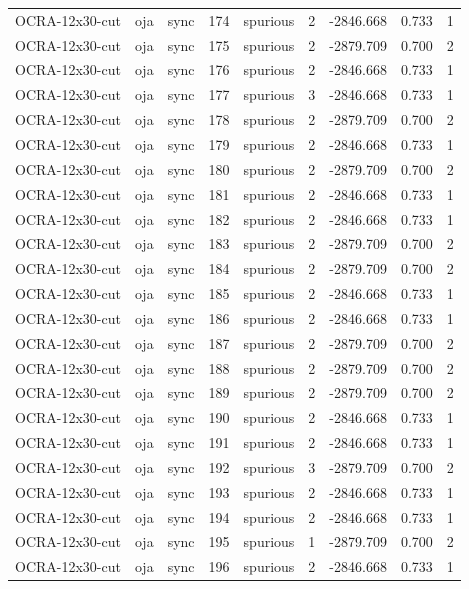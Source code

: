\begin{tabular}{lllrlrrrr}
OCRA-12x30-cut & oja & sync & 174 & spurious & 2 & -2846.668 & 0.733 & 1 \\
OCRA-12x30-cut & oja & sync & 175 & spurious & 2 & -2879.709 & 0.700 & 2 \\
OCRA-12x30-cut & oja & sync & 176 & spurious & 2 & -2846.668 & 0.733 & 1 \\
OCRA-12x30-cut & oja & sync & 177 & spurious & 3 & -2846.668 & 0.733 & 1 \\
OCRA-12x30-cut & oja & sync & 178 & spurious & 2 & -2879.709 & 0.700 & 2 \\
OCRA-12x30-cut & oja & sync & 179 & spurious & 2 & -2846.668 & 0.733 & 1 \\
OCRA-12x30-cut & oja & sync & 180 & spurious & 2 & -2879.709 & 0.700 & 2 \\
OCRA-12x30-cut & oja & sync & 181 & spurious & 2 & -2846.668 & 0.733 & 1 \\
OCRA-12x30-cut & oja & sync & 182 & spurious & 2 & -2846.668 & 0.733 & 1 \\
OCRA-12x30-cut & oja & sync & 183 & spurious & 2 & -2879.709 & 0.700 & 2 \\
OCRA-12x30-cut & oja & sync & 184 & spurious & 2 & -2879.709 & 0.700 & 2 \\
OCRA-12x30-cut & oja & sync & 185 & spurious & 2 & -2846.668 & 0.733 & 1 \\
OCRA-12x30-cut & oja & sync & 186 & spurious & 2 & -2846.668 & 0.733 & 1 \\
OCRA-12x30-cut & oja & sync & 187 & spurious & 2 & -2879.709 & 0.700 & 2 \\
OCRA-12x30-cut & oja & sync & 188 & spurious & 2 & -2879.709 & 0.700 & 2 \\
OCRA-12x30-cut & oja & sync & 189 & spurious & 2 & -2879.709 & 0.700 & 2 \\
OCRA-12x30-cut & oja & sync & 190 & spurious & 2 & -2846.668 & 0.733 & 1 \\
OCRA-12x30-cut & oja & sync & 191 & spurious & 2 & -2846.668 & 0.733 & 1 \\
OCRA-12x30-cut & oja & sync & 192 & spurious & 3 & -2879.709 & 0.700 & 2 \\
OCRA-12x30-cut & oja & sync & 193 & spurious & 2 & -2846.668 & 0.733 & 1 \\
OCRA-12x30-cut & oja & sync & 194 & spurious & 2 & -2846.668 & 0.733 & 1 \\
OCRA-12x30-cut & oja & sync & 195 & spurious & 1 & -2879.709 & 0.700 & 2 \\
OCRA-12x30-cut & oja & sync & 196 & spurious & 2 & -2846.668 & 0.733 & 1 \\

\end{tabular}
